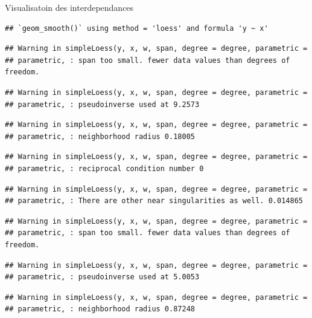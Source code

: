 \documentclass[11pt,ignorenonframetext,]{beamer}
\begin{document}
\begin{frame}[fragile]{Visualisatoin des interdependances}
\protect\hypertarget{visualisatoin-des-interdependances}{}

\begin{verbatim}
## `geom_smooth()` using method = 'loess' and formula 'y ~ x'
\end{verbatim}

\begin{verbatim}
## Warning in simpleLoess(y, x, w, span, degree = degree, parametric =
## parametric, : span too small. fewer data values than degrees of freedom.
\end{verbatim}

\begin{verbatim}
## Warning in simpleLoess(y, x, w, span, degree = degree, parametric =
## parametric, : pseudoinverse used at 9.2573
\end{verbatim}

\begin{verbatim}
## Warning in simpleLoess(y, x, w, span, degree = degree, parametric =
## parametric, : neighborhood radius 0.18005
\end{verbatim}

\begin{verbatim}
## Warning in simpleLoess(y, x, w, span, degree = degree, parametric =
## parametric, : reciprocal condition number 0
\end{verbatim}

\begin{verbatim}
## Warning in simpleLoess(y, x, w, span, degree = degree, parametric =
## parametric, : There are other near singularities as well. 0.014865
\end{verbatim}

\begin{verbatim}
## Warning in simpleLoess(y, x, w, span, degree = degree, parametric =
## parametric, : span too small. fewer data values than degrees of freedom.
\end{verbatim}

\begin{verbatim}
## Warning in simpleLoess(y, x, w, span, degree = degree, parametric =
## parametric, : pseudoinverse used at 5.0053
\end{verbatim}

\begin{verbatim}
## Warning in simpleLoess(y, x, w, span, degree = degree, parametric =
## parametric, : neighborhood radius 0.87248
\end{verbatim}


\end{frame}
\end{document}
